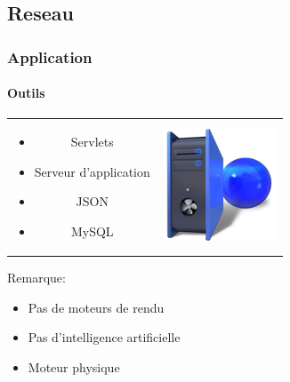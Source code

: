 \subsection{Reseau}

\begin{frame}
\frametitle{Application}
\framesubtitle{Outils}
	\begin{center}
		\begin{tabular}{cc}
			\begin{minipage}{7cm}
			
			
				\begin{itemize}
				  \item Servlets
				  \item Serveur d'application
				  \item JSON
				  \item MySQL
				\end{itemize}

			
			\end{minipage}&
			
			\begin{minipage}{4cm}
				\includegraphics[scale=0.5]{img/serveur2.png} 
			\end{minipage}\\
				
			\end{tabular}
			
			\begin{block}{Remarque: }
				\begin{itemize}
				  \item Pas de moteurs de rendu
				  \item Pas d'intelligence artificielle
				  \item Moteur physique
				\end{itemize}
			\end{block}
			
			
	\end{center}
			
\end{frame}

